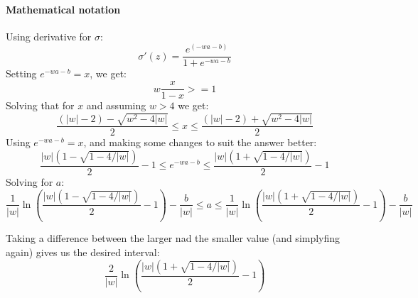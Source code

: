 \documentclass{article}
\begin{document}
\paragraph{Mathematical notation}
Using derivative for $\sigma$:
$$\sigma'(z) = \frac{e^(-wa-b)}{1 + e^{-wa-b}}$$
Setting $e^{-wa-b} = x$, we get:
$$w \frac{x}{1-x} >= 1$$
Solving that for $x$ and assuming $w > 4$ we get:
$$\frac{(|w|-2)-\sqrt{w^2-4|w|}}{2} \leq x \leq \frac{(|w|-2)+\sqrt{w^2-4|w|}}{2}$$
Using $e^{-wa-b} = x$, and making some changes to suit the answer better:
$$\frac{|w|\left(1-\sqrt{1-4/|w|}\right)}{2}-1 \leq e^{-wa-b} \leq \frac{|w|\left(1+\sqrt{1-4/|w|}\right)}{2}-1$$
Solving for $a$:
$$\frac{1}{|w|}\ln\left(\frac{|w|\left(1-\sqrt{1-4/|w|}\right)}{2}-1\right) - \frac{b}{|w|}\leq a \leq \frac{1}{|w|}\ln\left(\frac{|w|\left(1+\sqrt{1-4/|w|}\right)}{2}-1\right)-\frac{b}{|w|}$$

Taking a difference between the larger nad the smaller value (and simplyfing again) gives us the desired interval:
$$\frac{2}{|w|} \ln{\left(\frac{|w|(1+\sqrt{1-4/|w|})}{2}-1\right)}$$
\end{document}
